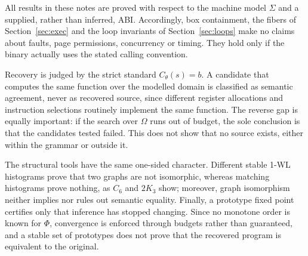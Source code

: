 \documentclass[11pt]{article}
\theoremstyle{definition}
\theoremstyle{remark}
\begin{document}
All results in these notes are proved with respect to the machine model $\Sigma$ and a supplied, rather than inferred, ABI. Accordingly, box containment, the fibers of Section~\ref{sec:exec} and the loop invariants of Section~\ref{sec:loops} make no claims about faults, page permissions, concurrency or timing. They hold only if the binary actually uses the stated calling convention.

Recovery is judged by the strict standard $C_\theta(s) = b$. A candidate that computes the same function over the modelled domain is classified as semantic agreement, never as recovered source, since different register allocations and instruction selections routinely implement the same function. The reverse gap is equally important: if the search over $\Omega$ runs out of budget, the sole conclusion is that the candidates tested failed. This does not show that no source exists, either within the grammar or outside it.

The structural tools have the same one-sided character. Different stable 1-WL histograms prove that two graphs are not isomorphic, whereas matching histograms prove nothing, as $C_6$ and $2K_3$ show; moreover, graph isomorphism neither implies nor rules out semantic equality. Finally, a prototype fixed point certifies only that inference has stopped changing. Since no monotone order is known for $\Phi$, convergence is enforced through budgets rather than guaranteed, and a stable set of prototypes does not prove that the recovered program is equivalent to the original.
\end{document}

